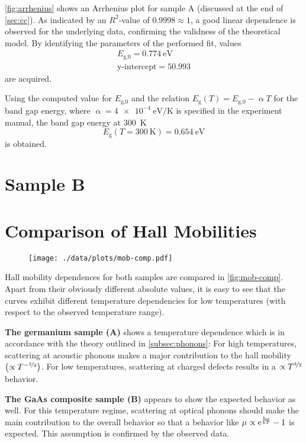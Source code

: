 \autoref{fig:arrhenius} shows an Arrhenius plot for sample A (discussed at the end of \autoref{sec:cc}).
As indicated by an $R^2$-value of $0.9998\approx 1$, a good linear dependence is observed for the underlying data, confirming the validness of the theoretical model.
By identifying the parameters of the performed fit, values
\begin{align*}
	E_\text{g,0} = \SI{0.774}{\eV} \\
	\text{y-intercept} = \num{50.993} %
\end{align*}
are acquired.

Using the computed value for $E_\text{g,0}$ and the relation $E_\text{g}(T) = E_\text{g,0} -\upalpha T$ for the band gap energy, where $\upalpha=\SI{4e-4}{\eV\per\kelvin}$ is specified in the experiment manual, the band gap energy at \SI{300}{\kelvin}
\begin{equation*}
	E_\text{g}\left(T = \SI{300}{\kelvin}\right) = \SI{0.654}{\eV}
\end{equation*}
is obtained.

\section{Sample B}

\section{Comparison of Hall Mobilities}
\begin{figure}
  \centering
  \texttt{[image: ./data/plots/mob-comp.pdf]}
  \label{fig:mob-comp}
\end{figure}

Hall mobility dependences for both samples are compared in \autoref{fig:mob-comp}.
Apart from their obviously different absolute values, it is easy to see that the curves exhibit different temperature dependencies for low temperatures (with respect to the observed temperature range).

\textbf{The germanium sample (A)} shows a temperature dependence which is in accordance with the theory outlined in \autoref{subsec:phonons}: For high temperatures, scattering at acoustic phonons makes a major contribution to the hall mobility $\left(\propto T^{-\nicefrac{3}{2}}\right)$.
For low temperatures, scattering at charged defects results in a $\propto T^{\nicefrac{3}{2}}$ behavior.

\textbf{The GaAs composite sample (B)} appears to show the expected behavior as well.
For this temperature regime, scattering at optical phonons should make the main contribution to the overall behavior so that a behavior like $\mu\propto \mathrm{e}^\frac{\hbar \omega}{k T} - 1$ is expected.
This assumption is confirmed by the observed data.

% 	
